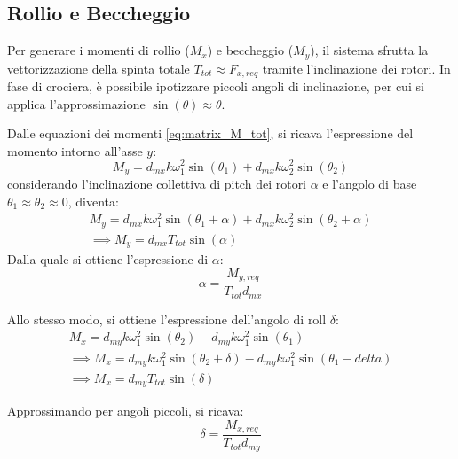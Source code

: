 \subsection{Rollio e Beccheggio}
Per generare i momenti di rollio ($M_x$) e beccheggio ($M_y$), il sistema sfrutta la vettorizzazione della spinta totale $T_{tot} \approx F_{x,req}$ tramite l'inclinazione dei rotori. 
In fase di crociera, è possibile ipotizzare piccoli angoli di inclinazione, per cui si applica l'approssimazione $\sin(\theta) \approx \theta$.

Dalle equazioni dei momenti \ref{eq:matrix_M_tot}, si ricava l'espressione del momento intorno all'asse $y$:
\begin{equation}
        M_y = d_{mx} k \omega_1^2 \sin(\theta_1) + d_{mx} k \omega_2^2 \sin(\theta_2)
\end{equation}
considerando l'inclinazione collettiva di pitch dei rotori $\alpha$ e l'angolo di base \hbox{$\theta_1 \approx \theta_2 \approx 0$}, diventa:
\begin{equation}
    \begin{matrix}
        M_y = d_{mx} k \omega_1^2 \sin(\theta_1 + \alpha) + d_{mx} k \omega_2^2 \sin(\theta_2 + \alpha) \\
        \implies M_y = d_{mx} T_{tot} \sin(\alpha)
    \end{matrix}
\end{equation}
Dalla quale si ottiene l'espressione di $\alpha$:
\begin{equation}
    \alpha = \frac{M_{y,req}}{T_{tot} d_{mx}}
\end{equation}

Allo stesso modo, si ottiene l'espressione dell'angolo di roll $\delta$:
\begin{equation}
    \begin{matrix}
        M_x = d_{my} k \omega_1^2 \sin(\theta_2) - d_{my} k \omega_1^2 \sin(\theta_1)\\
        \implies M_x = d_{my} k \omega_1^2 \sin(\theta_2 + \delta) - d_{my} k \omega_1^2 \sin(\theta_1 - delta)\\
        \implies M_x = d_{my} T_{tot} \sin(\delta)
    \end{matrix}
\end{equation}

Approssimando per angoli piccoli, si ricava:
\begin{equation}
    \delta = \frac{M_{x,req}}{T_{tot} d_{my}}
\end{equation}

